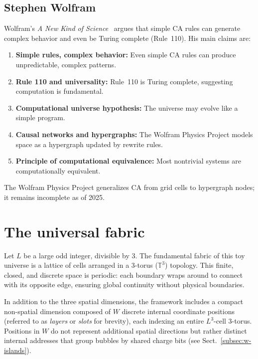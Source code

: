 \documentclass{ijuc}
\begin{document}
\subsection*{Stephen Wolfram}
Wolfram's \emph{A New Kind of Science}~\cite{wolfram} argues that simple CA rules can generate complex behavior and even be Turing complete (Rule~110). His main claims are:
\begin{enumerate}
  \item \textbf{Simple rules, complex behavior:} Even simple CA rules can produce unpredictable, complex patterns.
  \item \textbf{Rule 110 and universality:} Rule~110 is Turing complete, suggesting computation is fundamental.
  \item \textbf{Computational universe hypothesis:} The universe may evolve like a simple program.
  \item \textbf{Causal networks and hypergraphs:} The Wolfram Physics Project \cite{wolfram2020physics} models space as a hypergraph updated by rewrite rules.
  \item \textbf{Principle of computational equivalence:} Most nontrivial systems are computationally equivalent.
\end{enumerate}

The Wolfram Physics Project generalizes CA from grid cells to hypergraph nodes; it remains incomplete as of 2025.

\section{The universal fabric \label{sec:space-and-time}}

Let \( L \) be a large odd integer, divisible by 3. The fundamental fabric of this toy universe is a lattice of cells arranged in a 
3-torus (\( \mathbb{T}^3 \)) topology. This finite, closed, and discrete space is periodic: each boundary wraps around to connect with its opposite edge, ensuring global continuity without physical boundaries.

In addition to the three spatial dimensions, the framework includes a compact non-spatial dimension composed of \(W\) discrete internal coordinate positions (referred to as \emph{layers} or \emph{slots} for brevity), 
each indexing an entire \(L^3\)-cell 3-torus.  Positions in \(W\) do not represent additional spatial directions but rather distinct internal addresses that group bubbles by shared charge bits (see Sect.~\ref{subsec:w-islands}).
\end{document}
